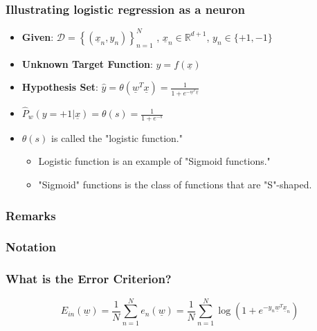     \subsubsection{Illustrating logistic regression as a neuron}
    \begin{definition}
        \begin{itemize}
            \item \textbf{Given}: $\mathcal{D} = \left\{ \left( \underline{x}_n, y_n \right) \right\}_{n=1}^{N}$ , $\underline{x}_n \in \mathbb{R}^{d+1}$, $y_n \in \{+1, -1\}$
            \item \textbf{Unknown Target Function}: $y = f(\underline{x})$
            \item \textbf{Hypothesis Set}: $\hat{y} = \theta\left( \underline{w}^T \underline{x} \right) = \frac{1}{1 + e^{-\underline{w}^T \underline{x}}}$
            \item $\hat{P}_w(y = +1| \underline{x}) = \theta(s) = \frac{1}{1 + e^{-s}}$
            \item $\theta(s)$ is called the "logistic function."
            \begin{itemize}
                \item Logistic function is an example of "Sigmoid functions."
                \item "Sigmoid" functions is the class of functions that are "S"-shaped.
            \end{itemize}
        \end{itemize}
    \end{definition}

    \subsubsection{Remarks}

    \subsubsection{Notation}

    \subsubsection{What is the Error Criterion?}
    \begin{definition}
        \begin{equation}
            E_{in}(\underline{w}) = \frac{1}{N} \sum_{n=1}^{N} e_n(\underline{w}) = \frac{1}{N} \sum_{n=1}^{N} \log \left( 1 + e^{-y_n \underline{w}^T \underline{x}_n} \right)
        \end{equation}
    \end{definition}

